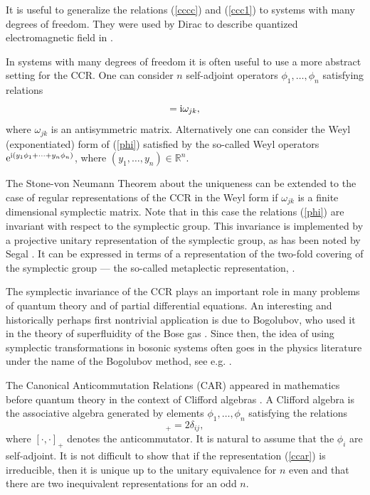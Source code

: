 \documentclass{svmult}
\newcommand{\beq}{\begin{equation}}
\newcommand{\eeq}{\end{equation}}
\def\rr{{\mathbb R}}
\def\i{{\rm i}}
\def\e{{\rm e}}
\def\e{{\rm e}}
\begin{document}
It is useful to generalize
the relations  (\ref{cccc}) and (\ref{ccc1}) to
systems with many degrees of freedom.
They were used by Dirac to describe quantized electromagnetic field in 
\cite{Di1}.

In systems with many degrees of freedom it is often useful to use a
more abstract setting for the CCR.
One can  consider $n$ self-adjoint operators $\phi_1,\dots,\phi_n$
satisfying relations
\beq [\phi_j,\phi_k]=\i\omega_{jk},\label{phi}\eeq
where $\omega_{jk}$ is an antisymmetric matrix.
Alternatively one can consider the Weyl (exponentiated) form of  (\ref{phi})
satisfied by the so-called Weyl operators $\e^{\i(y_1\phi_1+\cdots+y_n\phi_n
)}$, where $(y_1,\dots,y_n)\in\rr^n$.

The  Stone-von Neumann Theorem about the uniqueness 
can be extended to the case of regular
representations of the CCR in the Weyl form  if $\omega_{jk}$ is
a finite dimensional symplectic
matrix. 
Note that in this case  the relations (\ref{phi}) are invariant with respect
to the symplectic group. This invariance is implemented by a projective 
 unitary representation of the symplectic group, as has been noted by Segal
 \cite{Seg1}.
 It can be expressed in terms
 of a 
representation
 of the two-fold covering of the symplectic group --- the so-called
 metaplectic representation, \cite{Weil,Sh}.

The symplectic invariance of the 
CCR plays an important role in many problems of
quantum theory and of partial differential equations. An interesting and
historically perhaps  first nontrivial 
application is due to Bogolubov, who used it in
the theory of superfluidity of the Bose gas 
\cite{Bog}. Since then, the idea of using symplectic
transformations in bosonic systems often goes in the physics literature under
the name of the Bogolubov method, see e.g. \cite{FW}.


The Canonical Anticommutation Relations (CAR) appeared in mathematics before
quantum theory in the context  of Clifford algebras \cite{Cl}.
 A Clifford algebra is the
associative algebra generated by elements $\phi_1,\dots,\phi_n$ satisfying the
relations
\beq
[\phi_i,\phi_j]_+=2\delta_{ij},
\label{ccar}
\eeq
where $[\cdot,\cdot]_+$ denotes the anticommutator. It is natural to assume 
 that the $\phi_i$ are self-adjoint.
 It is not
difficult to show that if the representation (\ref{ccar})
is irreducible, then it is
 unique up to the unitary equivalence for $n$ even
 and  that there are two inequivalent representations for  an odd $n$.
\end{document}
